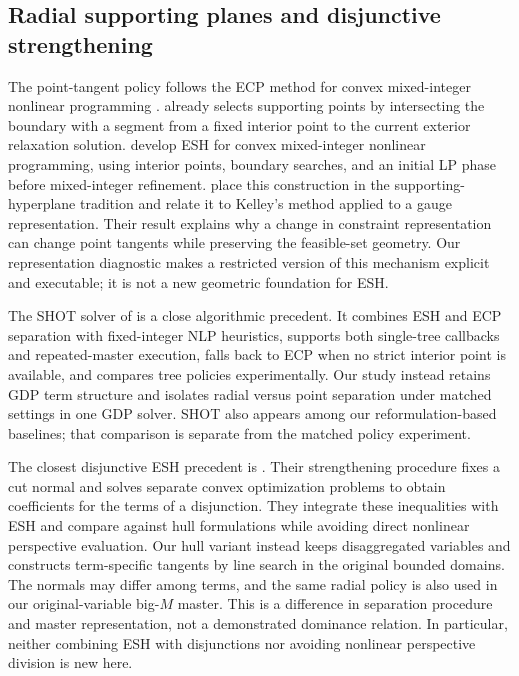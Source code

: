 \subsection{Radial supporting planes and disjunctive strengthening}
The point-tangent policy follows the ECP method for convex mixed-integer nonlinear programming \citep{westerlund1995}. \citet{veinott1967} already selects supporting points by intersecting the boundary with a segment from a fixed interior point to the current exterior relaxation solution. \citet{kronqvist2016} develop ESH for convex mixed-integer nonlinear programming, using interior points, boundary searches, and an initial LP phase before mixed-integer refinement. \citet{serrano2020} place this construction in the supporting-hyperplane tradition and relate it to Kelley's method applied to a gauge representation. Their result explains why a change in constraint representation can change point tangents while preserving the feasible-set geometry. Our representation diagnostic makes a restricted version of this mechanism explicit and executable; it is not a new geometric foundation for ESH.

The SHOT solver of \citet{lundell2022} is a close algorithmic precedent. It combines ESH and ECP separation with fixed-integer NLP heuristics, supports both single-tree callbacks and repeated-master execution, falls back to ECP when no strict interior point is available, and compares tree policies experimentally. Our study instead retains GDP term structure and isolates radial versus point separation under matched settings in one GDP solver. SHOT also appears among our reformulation-based baselines; that comparison is separate from the matched policy experiment.

The closest disjunctive ESH precedent is \citet{kronqvist2021}. Their strengthening procedure fixes a cut normal and solves separate convex optimization problems to obtain coefficients for the terms of a disjunction. They integrate these inequalities with ESH and compare against hull formulations while avoiding direct nonlinear perspective evaluation. Our hull variant instead keeps disaggregated variables and constructs term-specific tangents by line search in the original bounded domains. The normals may differ among terms, and the same radial policy is also used in our original-variable big-$M$ master. This is a difference in separation procedure and master representation, not a demonstrated dominance relation. In particular, neither combining ESH with disjunctions nor avoiding nonlinear perspective division is new here.

